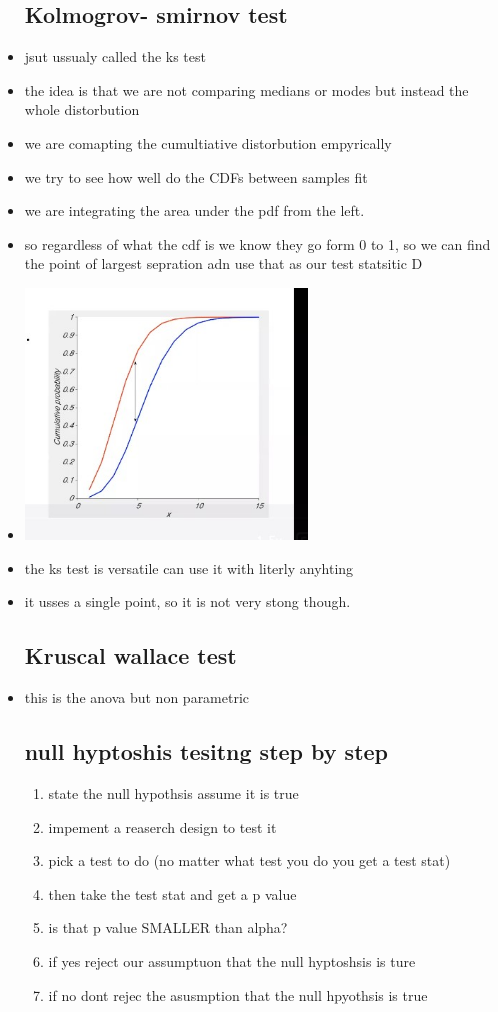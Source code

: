 \documentclass{article}
\begin{document}
\begin{itemize}
\subsection{Kolmogrov- smirnov test}
\item jsut ussualy called the ks test 
\item the idea is that we are not comparing medians or modes but instead the whole distorbution 
\item we are comapting the cumultiative distorbution empyrically
\item we try to see how well do the CDFs between samples fit 
\item we are integrating the area under the pdf from the left. 
\item so regardless of what the cdf is we know they go form 0 to 1, so we can find the point of largest sepration adn use that as our test statsitic D
\item \includegraphics[width=7.5cm]{Final_Review/lecture_4/KS_1.jpg}
\item the ks test is versatile can use it with literly anyhting 
\item it usses a single point, so it is not very stong though. 
\subsection{Kruscal wallace test}
\item this is the anova but non parametric 
\subsection{null hyptoshis tesitng step by step}
\begin{enumerate}
    \item state the null hypothsis assume it is true 
    \item impement a reaserch design to test it
    \item pick a test to do (no matter what test you do you get a test stat) 
    \item then take the test stat and get a p value 
    \item is that p value SMALLER than alpha?
    \item if yes reject our assumptuon that the null hyptoshsis is ture 
    \item if no dont rejec the asusmption that the null hpyothsis is true
\end{enumerate}

\end{itemize}
\end{document}
